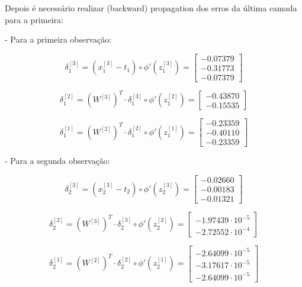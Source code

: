 \documentclass[a4paper,12pt]{article} %
\begin{document}
\begin{enumerate}
Depois é necessário realizar (backward) propagation dos erros da última camada para a primeira:

- Para a primeira observação:

\begin{equation*}
    \delta^{[3]}_1 = (x^{[3]}_1 - t_1) \circ \phi'(z^{[3]}_1) = \begin{bmatrix} -0.07379 \\ -0.31773 \\ -0.07379 \end{bmatrix}
\end{equation*}

\begin{equation*}
    \delta^{[2]}_1 = (W^{[3]})^T \cdot \delta^{[3]}_1 \circ \phi'(z^{[2]}_1) = \begin{bmatrix} -0.43870\\ -0.15535 \end{bmatrix}
\end{equation*}

\begin{equation*}
    \delta^{[1]}_1 = (W^{[2]})^T \cdot \delta^{[2]}_1 \circ \phi'(z^{[1]}_1) = \begin{bmatrix} -0.23359 \\ -0.40110 \\ -0.23359 \end{bmatrix}
\end{equation*}

- Para a segunda observação:

\begin{equation*}
    \delta^{[3]}_2 = (x^{[3]}_2 - t_2) \circ \phi'(z^{[3]}_2) = \begin{bmatrix} -0.02660 \\ -0.00183 \\ -0.01321 \end{bmatrix}
\end{equation*}

\begin{equation*}
    \delta^{[2]}_2 = (W^{[3]})^T \cdot \delta^{[3]}_2 \circ \phi'(z^{[2]}_2) = \begin{bmatrix} -1.97439\cdot 10^{-5} \\ -2.72552\cdot 10^{-4} \end{bmatrix}
\end{equation*}

\begin{equation*}
    \delta^{[1]}_2 = (W^{[2]})^T \cdot \delta^{[2]}_2 \circ \phi'(z^{[1]}_2) = \begin{bmatrix} -2.64099\cdot 10^{-5} \\ -3.17617\cdot 10^{-5} \\ -2.64099\cdot 10^{-5} \end{bmatrix}
\end{equation*}


\end{enumerate}
\end{document}
